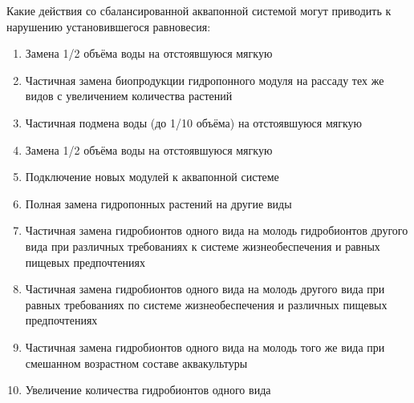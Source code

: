 
Какие действия со сбалансированной аквапонной системой могут приводить к нарушению установившегося равновесия:

\begin{enumerate}
    \item Замена 1/2 объёма воды на отстоявшуюся мягкую
    \item Частичная замена биопродукции гидропонного модуля на рассаду тех же видов с увеличением количества растений
    \item Частичная подмена воды (до 1/10 объёма) на отстоявшуюся мягкую
    \item Замена 1/2 объёма воды на отстоявшуюся мягкую
    \item Подключение новых модулей к аквапонной системе
    \item Полная замена гидропонных растений на другие виды
    \item Частичная замена гидробионтов одного вида на молодь гидробионтов другого вида при различных требованиях к системе жизнеобеспечения и равных пищевых предпочтениях
    \item Частичная замена гидробионтов одного вида на молодь другого вида при равных требованиях по системе жизнеобеспечения и различных пищевых предпочтениях
    \item Частичная замена гидробионтов одного вида на молодь того же вида при смешанном возрастном составе аквакультуры
    \item Увеличение количества гидробионтов одного вида
\end{enumerate}